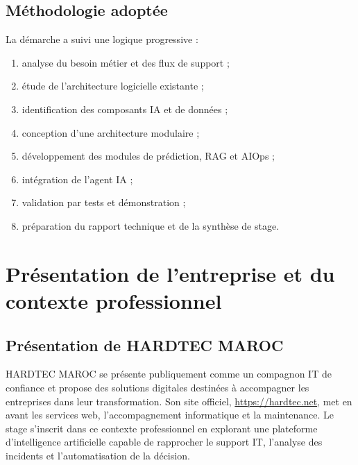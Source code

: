 \documentclass[11pt,a4paper]{report}
\begin{document}
\section{Méthodologie adoptée}
La démarche a suivi une logique progressive :
\begin{enumerate}[leftmargin=1.8em]
    \item analyse du besoin métier et des flux de support ;
    \item étude de l’architecture logicielle existante ;
    \item identification des composants IA et de données ;
    \item conception d’une architecture modulaire ;
    \item développement des modules de prédiction, RAG et AIOps ;
    \item intégration de l’agent IA ;
    \item validation par tests et démonstration ;
    \item préparation du rapport technique et de la synthèse de stage.
\end{enumerate}

\chapter{Présentation de l’entreprise et du contexte professionnel}
\section{Présentation de HARDTEC MAROC}
HARDTEC MAROC se présente publiquement comme un compagnon IT de confiance et propose des solutions digitales destinées à accompagner les entreprises dans leur transformation. Son site officiel, \url{https://hardtec.net}, met en avant les services web, l’accompagnement informatique et la maintenance. Le stage s’inscrit dans ce contexte professionnel en explorant une plateforme d’intelligence artificielle capable de rapprocher le support IT, l’analyse des incidents et l’automatisation de la décision.
\end{document}
